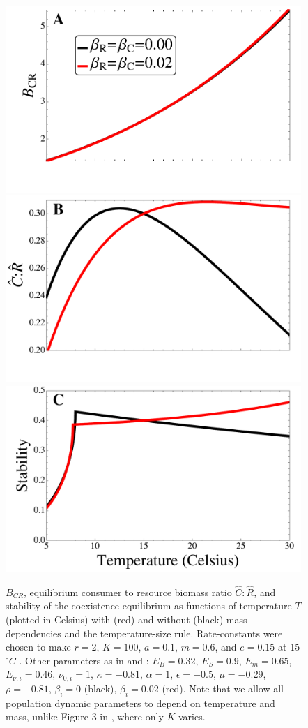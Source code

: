\documentclass[11pt]{article}
\begin{document}
\begin{figure}[!ht]
\centering
\includegraphics[width=0.5\linewidth]{BCRAllTempMassDep}\\\vspace{-0.75cm}
\includegraphics[width=0.5\linewidth]{CtoRAllTempMassDep}\\\vspace{-0.75cm}
\includegraphics[width=0.5\linewidth]{StabilityAllTempMassDep}
\caption{
$B_{CR}$, equilibrium consumer to resource biomass ratio $\hat{C}:\hat{R}$, and stability of the coexistence equilibrium as functions of temperature $T$ (plotted in Celsius) with (red) and without (black) mass dependencies and the temperature-size rule.
Rate-constants were chosen to make $r = 2$, $K = 100$, $a = 0.1$, $m = 0.6$, and $e = 0.15$ at 15$^\circ C$ \citep[as in Figure 3 of][]{Gilbert2014}.
Other parameters as in \cite{Gilbert2014} and \cite{DeLong2015}: $E_B = 0.32$, $E_S = 0.9$, $E_m = 0.65$, $E_{\nu,i} = 0.46$, $\nu_{0,i} = 1$, $\kappa = -0.81$, $\alpha = 1$, $\epsilon = -0.5$, $\mu = -0.29$, $\rho = -0.81$, $\beta_i = 0$ (black), $\beta_i = 0.02$ (red).  
Note that we allow all population dynamic parameters to depend on temperature and mass, unlike Figure 3 in \cite{Gilbert2014}, where only $K$ varies.
}
\label{AllTempMassDep}
\end{figure}
\end{document}
